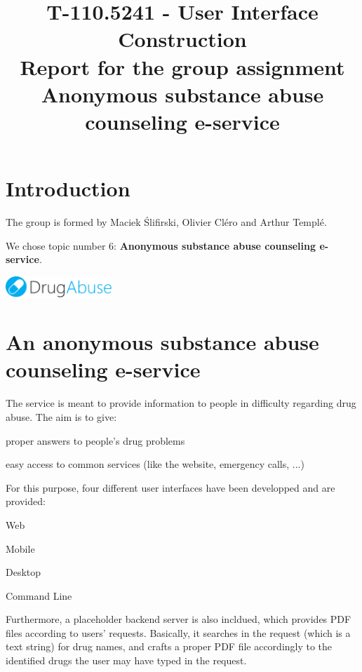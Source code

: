 \documentclass[a4paper,12pt, twocolumn]{article}
\title{  {\Large T-110.5241 - User Interface Construction}\\
		\textbf{Report for the group assignment}\\
		Anonymous substance abuse counseling e-service
	}
\newenvironment{my_itemize}{
\begin{itemize}
	\setlength{\topsep}{0pt}
	\setlength{\itemsep}{3pt}
	\setlength{\parskip}{0pt}
	\setlength{\parsep}{0pt}}
{\end{itemize}
}
\newenvironment{my_enumerate}{
\begin{enumerate}
     \setlength{\itemsep}{3pt}
     \setlength{\parskip}{0pt}
     \setlength{\parsep}{0pt}}
{\end{enumerate}
}
\begin{document}
\maketitle


\section*{Introduction}

The group is formed by Maciek \'{S}lifirski, Olivier Cl\'{e}ro and Arthur Templ\'{e}.

We chose topic number 6: \textbf{Anonymous substance abuse counseling e-service}.\\
\begin{center}
\includegraphics[width=0.3\textwidth]{images/logo_with_text.pdf}
\label{cli_1}
\end{center}
\section*{An anonymous substance abuse counseling e-service}

The service is meant to provide information to people in difficulty regarding drug abuse.
The aim is to give:
\begin{my_enumerate}
 \item proper answers to people's drug problems
 \item easy access to common services (like the website, emergency calls, ...)
\end{my_enumerate}
For this purpose, four different user interfaces have been developped and are provided:
\begin{my_itemize}
 \item Web
 \item Mobile
 \item Desktop
 \item Command Line
\end{my_itemize}
Furthermore, a placeholder backend server is also incldued, which provides PDF files according to users' requests. Basically, it searches in the request (which is a text string) for drug names, and crafts a proper PDF file accordingly to the identified drugs the user may have typed in the request.

\end{document}
